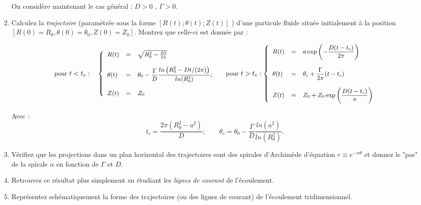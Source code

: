 \begin{enumerate}

On considère maintenant le cas général : $D > 0$ , $\Gamma > 0$.

\item Calculez la {\em trajectoire} (paramétrée sous la forme $[R(t) ; \theta(t) ; Z(t)]$ ) 
d'une particule fluide située initialement à la position $[R(0) = R_0, \theta(0) = \theta_0, Z(0) = Z_0]$.
Montrez que celle-ci est donnée par :

$$
\small
 \mbox{ pour } t<t_c : \quad
\left\{ 
\begin{array}{lcl}
R(t) &=& \sqrt{R_0^2 - \frac{D t}{2 \pi} }
 \\ \\
\theta(t) &=& \displaystyle \theta_0 - \frac{\Gamma}{D}  \frac{ ln \left( R_0^2 - D t/(2 \pi) \right)}
{  ln (R_0^2) };   \\
\\
Z(t) &=& Z_0 
\end{array}
\right. 
\quad
\mbox{ pour } t>t_c :
\left\{ 
\begin{array}{lcl}
R(t) &=& \displaystyle a \exp \left( - \frac{D (t-t_c)}{2 \pi} \right) \\ \\
\theta(t) &=& \displaystyle \theta_c + \frac{\Gamma}{2 \pi} (t-t_c)  \\
\\
Z(t) &=& \displaystyle Z_0 + Z_0  \exp \left( \frac{D (t-t_c)}{ \pi} \right) 
\end{array}
\right. 
$$ 



Avec  : 
$$
t_c  = \frac{2\pi  (R_0^2- a^2)}{D} ; \quad \quad 
\theta_c = \theta_0 - \frac{\Gamma}{D}  \frac{ ln (a^2  ) }{  ln (R_0^2) }   .
$$


\item Vérifiez que les projections dans un plan horizontal des trajectoires sont des spirales d'Archimède d'équation $r \equiv e^{-\alpha \theta}$ et donnez le "pas" de la spirale $\alpha$ en fonction de $\Gamma$ et $D$. 

\item Retrouvez ce résultat plus simplement en étudiant les {\em lignes de courant} de l'écoulement.

\item Représentez schématiquement la forme des trajectoires (ou des lignes de courant) de l'écoulement tridimensionnel.

\end{enumerate}




